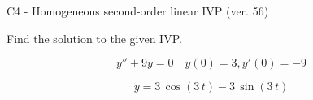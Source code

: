 \begin{exercise}
  \begin{exerciseTitle}C4 - Homogeneous second-order linear IVP (ver. 56)\end{exerciseTitle}
  \begin{exerciseStatement}
    
Find the solution to the given IVP.

    
\[y''+9y = 0 \hspace{1em} y(0) = 3 , y'(0) = -9\]

  \end{exerciseStatement}
  \begin{exerciseAnswer}
    
\[y= 3 \, \cos\left(3 \, t\right) - 3 \, \sin\left(3 \, t\right)\]

  \end{exerciseAnswer}
\end{exercise}